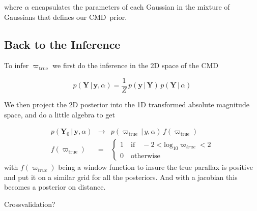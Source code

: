 \documentclass[modern]{aastex61}
\newcommand{\acronym}[1]{{\small{#1}}}
\newcommand{\cmd}{\acronym{CMD}}
\newcommand{\given}{\,|\,}
\newcommand{\true}{\mathrm{true}}
\begin{document}
where $\alpha$ encapsulates the parameters of each Gaussian in the mixture of Gaussians that defines our \cmd\ prior.

\subsection{Back to the Inference}

To infer $\varpi_{\true}$ we first do the inference in the 2D space of the \cmd

\begin{equation}
p(\mathbf{Y} \given \mathbf{y}, \alpha) = \frac{1}{Z} \, p(\mathbf{y} \given \mathbf{Y}) \, p(\mathbf{Y} \given \alpha)
\label{eq:posterior}
\end{equation}

We then project the 2D posterior into the 1D transformed absolute magnitude space, and do a little algebra to get

\begin{eqnarray}
p(\mathbf{Y}_0 \given \mathbf{y}, \alpha) &\rightarrow& p(\varpi_{\true} \given y, \alpha) \, f(\varpi_{\true}) \\
f(\varpi_{\true}) &=& \begin{cases}
              1 \quad \mathrm{if} \quad -2 < \mathrm{log}_{10} \varpi_{true} < 2\\
              0 \quad \mathrm{otherwise}
              \end{cases}
\label{eq:parallaxPost}
\end{eqnarray}
with $f(\varpi_{true})$ being a window function to insure the true parallax is positive and put it on a similar grid for all the posteriors.
And with a jacobian this becomes a posterior on distance.

Crossvalidation?
\end{document}
